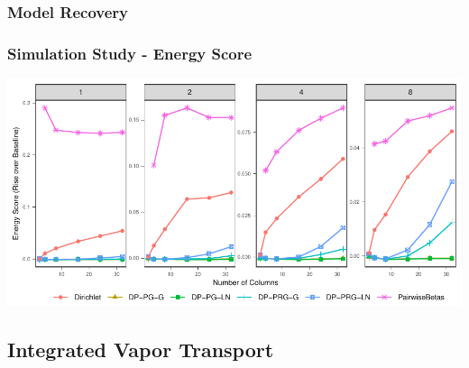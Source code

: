 \documentclass[aspectratio=169,10pt]{beamer}
\newlength{\frametextheight}
\begin{document}
\begin{frame}
\begin{minipage}{0.29\textwidth}
    \end{minipage}
\end{frame} %

\subsubsection{Model Recovery}

\begin{frame}
    \label{pgpareto:simstudy}
  \frametitle{Simulation Study - Energy Score}
  \begin{center}
    \includegraphics[height=0.9\frametextheight]{./ch1/images/sim_es_rise}
  \end{center}
  \hyperlink{pgpareto:simstudydetails}{}
\end{frame} %

\subsection{Integrated Vapor Transport}
\end{document}
